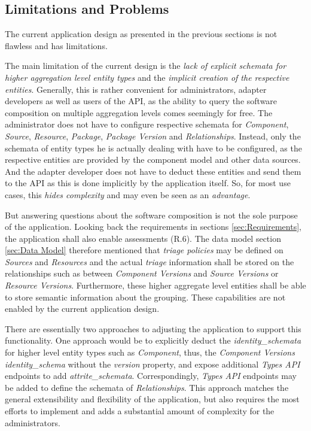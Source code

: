 \subsection{Limitations and Problems} \label{sec:Limitations and Problems}
The current application design as presented in the previous sections is not flawless and has limitations.\par 
The main limitation of the current design is the \emph{lack of explicit schemata for higher aggregation level entity types} and the \emph{implicit creation of the respective entities}. Generally, this is rather convenient for administrators, adapter developers as well as users of the API, as the ability to query the software composition on multiple aggregation levels comes seemingly for free. The administrator does not have to configure respective schemata for \emph{Component}, \emph{Source}, \emph{Resource}, \emph{Package}, \emph{Package Version} and \emph{Relationships}. Instead, only the schemata of entity types he is actually dealing with have to be configured, as the respective entities are provided by the component model and other data sources. And the adapter developer does not have to deduct these entities and send them to the API as this is done implicitly by the application itself. So, for most use cases, this \emph{hides complexity} and may even be seen as an \emph{advantage}.\par
But answering questions about the software composition is not the sole purpose of the application. Looking back the requirements in sections \ref{sec:Requirements}, the application shall also enable assessments (R.6). The data model section \ref{sec:Data Model} therefore mentioned that \emph{triage policies} may be defined on \emph{Sources} and \emph{Resources} and the actual \emph{triage} information shall be stored on the relationships such as between \emph{Component Versions} and \emph{Source Versions} or \emph{Resource Versions}. Furthermore, these higher aggregate level entities shall be able to store semantic information about the grouping. 
These capabilities are not enabled by the current application design.\par
There are essentially two approaches to adjusting the application to support this functionality. One approach would be to explicitly deduct the \emph{identity\_schemata} for higher level entity types such as \emph{Component}, thus, the \emph{Component Versions} \emph{identity\_schema} without the \emph{version} property, and expose additional \emph{Types API} endpoints to add \emph{attrite\_schemata}. Correspondingly, \emph{Types API} endpoints may be added to define the schemata of \emph{Relationships}. This approach matches the general extensibility and flexibility of the application, but also requires the most efforts to implement and adds a substantial amount of complexity for the administrators.\par
